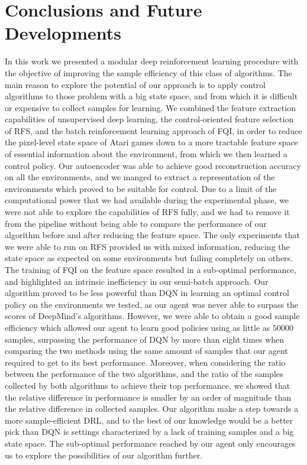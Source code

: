 \chapter{Conclusions and Future Developments}
\label{chapter7_conclusions}
\thispagestyle{empty}

\vspace{0.5cm}

In this work we presented a modular deep reinforcement learning procedure 
with the objective of improving the sample efficiency of this class of 
algorithms.
The main reason to explore the potential of our approach is to apply control
algorithms to those problem with a big state space, and from which it is 
difficult or expensive to collect samples for learning. 
We combined the feature extraction capabilities of unsupervised deep learning, 
the control-oriented feature selection of RFS, and the batch reinforcement 
learning approach of FQI, in order to reduce the pixel-level state
space of Atari games down to a more tractable feature space of essential 
information about the environment, from which we then learned a control policy.
Our autoencoder was able to achieve good reconstruction accuracy on all the
environments, and we manged to extract a representation of the environments 
which proved to be suitable for control.
Due to a limit of the computational power that we had available during the 
experimental phase, we were not able to explore the capabilities of RFS fully, 
and we had to remove it from the pipeline without being able to compare the 
performance of our algorithm before and after reducing the feature space. 
The only experiments that we were able to run on RFS provided us with mixed
information, reducing the state space as expected on some environments but 
failing completely on others. 
The training of FQI on the feature space resulted in a sub-optimal
performance, and highlighted an intrinsic inefficiency in our semi-batch 
approach.
Our algorithm proved to be less powerful than DQN in learning an optimal control
policy on the environments we tested, as our agent was never able to surpass the
scores of DeepMind's algorithms.
However, we were able to obtain a good sample efficiency which allowed our agent 
to learn good policies using as little as $50000$ samples, surpassing the 
performance of DQN by more than eight times when comparing the two methods 
using the same amount of samples that our agent required to get to its best
performance.
Moreover, when considering the ratio between the performance of the two 
algorithms, and the ratio of the samples collected by both algorithms to 
achieve their top performance, we showed that the relative difference in 
performance is smaller by an order of magnitude than the relative difference in 
collected samples.
Our algorithm make a step towards a more sample-efficient DRL, and to the
best of our knowledge would be a better pick than DQN is settings characterized 
by a lack of training samples and a big state space. The sub-optimal performance
reached by our agent only encourages us to explore the possibilities of our
algorithm further.

